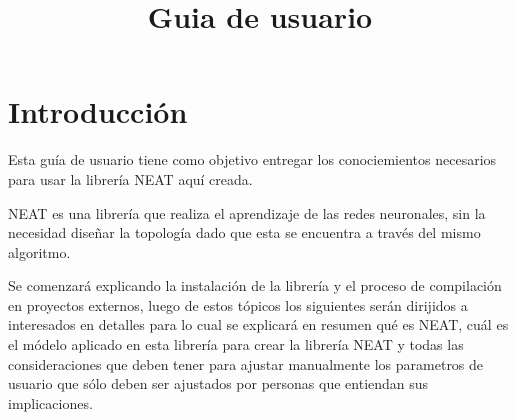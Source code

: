 \documentclass[11pt]{article}
\title{Guia de usuario}
\begin{document}
\maketitle

\newpage 

\section {Introducción}

Esta guía de usuario tiene como objetivo entregar los conociemientos necesarios para usar la librería NEAT aquí creada. \newline


NEAT es una librería que realiza el aprendizaje de las redes neuronales, sin la necesidad diseñar la topología dado que esta se encuentra a través del mismo algoritmo. \newline


Se comenzará explicando la instalación de la librería y el proceso de compilación en proyectos externos, luego de estos tópicos los siguientes serán dirijidos a interesados en detalles para lo cual se explicará en resumen qué es NEAT, cuál es el módelo aplicado en esta librería para crear la librería NEAT y todas las consideraciones que deben tener para ajustar manualmente los parametros de usuario que sólo deben ser ajustados por personas que entiendan sus implicaciones.

\newpage





\end{document}
